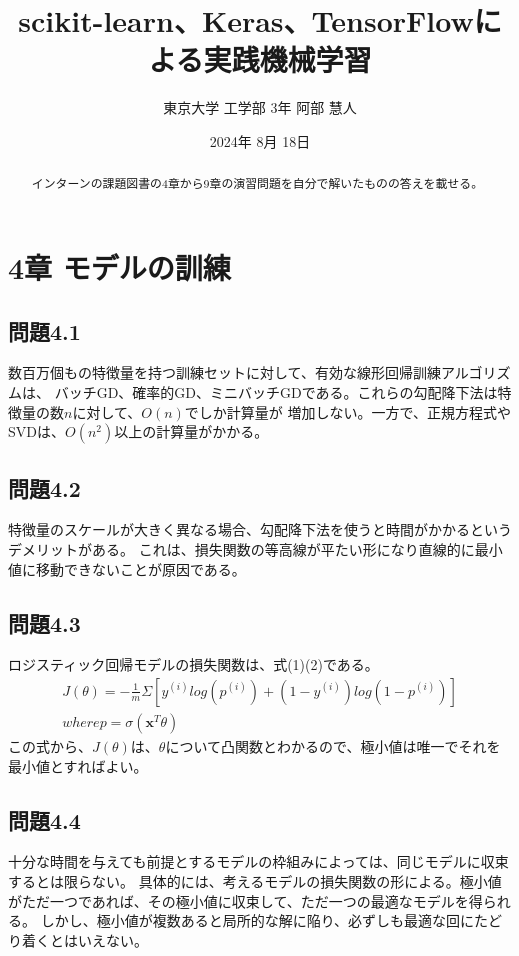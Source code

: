 \documentclass[a4j,twocolumn]{jsarticle}
\title{scikit-learn、Keras、TensorFlowによる実践機械学習}
\author{東京大学 工学部 3年 阿部 慧人}
\date{2024年 8月 18日}
\begin{document}
\begin{abstract}
インターンの課題図書の4章から9章の演習問題を自分で解いたものの答えを載せる。
\end{abstract}

\maketitle
\section{4章 モデルの訓練}
\subsection{問題4.1}
数百万個もの特徴量を持つ訓練セットに対して、有効な線形回帰訓練アルゴリズムは、
バッチGD、確率的GD、ミニバッチGDである。これらの勾配降下法は特徴量の数$n$に対して、$O(n)$でしか計算量が
増加しない。一方で、正規方程式やSVDは、$O(n^{2})$以上の計算量がかかる。
\subsection{問題4.2}
特徴量のスケールが大きく異なる場合、勾配降下法を使うと時間がかかるというデメリットがある。
これは、損失関数の等高線が平たい形になり直線的に最小値に移動できないことが原因である。

\subsection{問題4.3}
ロジスティック回帰モデルの損失関数は、式(1)(2)である。
\begin{gather}
    J(\theta) = -\frac{1}{m}\Sigma[y^{(i)}log(p^{(i)}) + (1-y^{(i)})log(1-p^{(i)})] \\
    where  p = \sigma(\bm{x}^{T}\theta)
\end{gather}
この式から、$J(\theta)$は、$\theta$について凸関数とわかるので、極小値は唯一でそれを最小値とすればよい。

\subsection{問題4.4}
十分な時間を与えても前提とするモデルの枠組みによっては、同じモデルに収束するとは限らない。
具体的には、考えるモデルの損失関数の形による。極小値がただ一つであれば、その極小値に収束して、ただ一つの最適なモデルを得られる。
しかし、極小値が複数あると局所的な解に陥り、必ずしも最適な回にたどり着くとはいえない。
\end{document}

